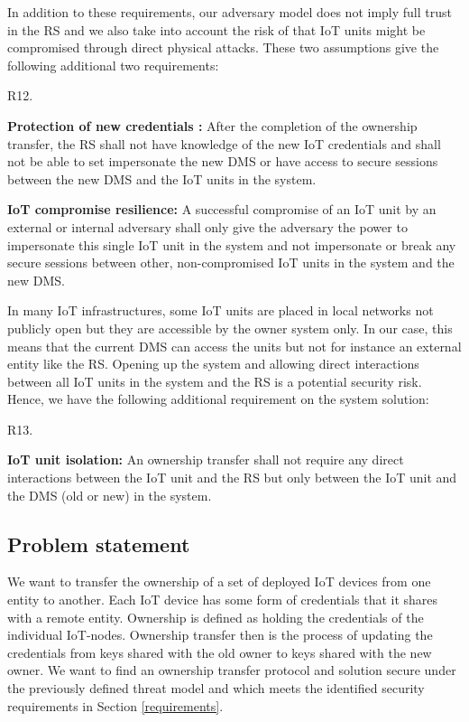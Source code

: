 {In addition to these requirements, our adversary model does not imply full trust in the RS and we also take into account the risk of that IoT units might be compromised through direct physical attacks. These two assumptions give the following additional two requirements:

\begin{labeling}{R12.}
\item [R11.] \textbf{Protection of new credentials :} After the completion of the ownership transfer, the RS shall not have knowledge of the new IoT credentials and shall not be able to set impersonate the new DMS or have access to secure sessions between the new DMS and the IoT units in the system.
\item [R12.] \textbf{IoT compromise resilience:} A successful compromise of an IoT unit by an external or internal adversary shall only give the adversary the power to impersonate this single IoT unit in the system and not impersonate or break any secure sessions between other, non-compromised IoT units in the system and the new DMS.
\end{labeling}

In many IoT infrastructures, some IoT units are placed in local networks not publicly open but they are accessible by the owner system only. In our case, this means that the current DMS can access the units but not for instance an external entity like the RS. Opening up the system and allowing direct interactions between all IoT units in the system and the RS is a potential security risk. Hence, we have the following additional requirement on the system solution:

\begin{labeling}{R13.}
\item [R13.] \textbf{IoT unit isolation:} An ownership transfer shall not require any direct interactions between the IoT unit and the RS but only between the IoT unit and the DMS (old or new) in the system.
\end{labeling}
\subsection{Problem statement}
\label{problem}
We want to transfer the ownership of a set of deployed IoT devices from one entity to another. Each IoT device has some form of credentials that it shares with a remote entity. Ownership is defined as holding the credentials of the individual IoT-nodes. Ownership transfer then is the process of updating the credentials from keys shared with the old owner to keys shared with the new owner. We want to find an ownership transfer protocol and solution secure under the previously defined threat model and which meets the identified security requirements in Section \ref{requirements}.

}

